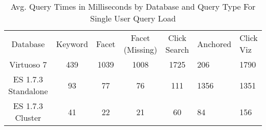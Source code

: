  \begin{table} 
    \begin{tabular}{ c c c c c }
        Database & Keyword & Facet & Facet (Missing) & Click Search & Anchored & Click Viz \\ 
        Virtuoso 7 & 439 & 1039 & 1008 & 1725 & 206 &  1790 \\ 
        ES 1.7.3 Standalone & 93 & 77 & 76 & 111 & 1356 & 1351 \\ 
        ES 1.7.3 Cluster & 41 & 22 & 21 & 60 & 84 & 156 \\ 
    \end{tabular} 
    \caption{Avg. Query Times in Milliseconds by Database and Query Type For Single User Query Load}
    \label{table:qt_single_user}
\end{table}

